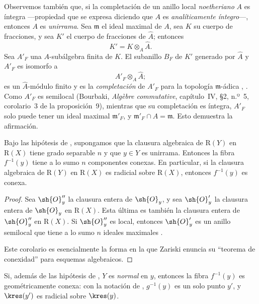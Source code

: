 \documentclass[oneside]{amsart}
\let\EGAOriginalLabel\label
\renewcommand{\label}[1]{\phantomsection\EGAOriginalLabel{#1}}
\begin{document}
Observemos también que, si la completación de un anillo local
\emph{noetheriano} $A$ es íntegra ---propiedad que se expresa diciendo que
$A$ es \emph{analíticamente íntegro}---, entonces $A$ es \emph{unirrama}.
Sea $\mathfrak{m}$ el ideal maximal de $A$, sea $K$ su cuerpo de
fracciones, y sea $K'$ el cuerpo de fracciones de $\widehat{A}$;
entonces
\[
  K'=K\otimes_A\widehat{A}.
\]
Sea $A'_F$ una $A$-subálgebra finita de $K$. El subanillo $B_F$ de
$K'$ generado por $\widehat{A}$ y $A'_F$ es isomorfo a
\[
  A'_F\otimes_A\widehat{A};
\]
es un $\widehat{A}$-módulo finito y es la \emph{completación} de $A'_F$
para la topología $\mathfrak{m}$-ádica
, . Como $A'_F$ es semilocal
(Bourbaki, \emph{Alg\`ebre commutative}, capítulo~IV, \S2, n.º~5,
corolario~3 de la proposición~9), mientras que su completación es
íntegra, $A'_F$ solo puede tener un ideal maximal $\mathfrak{m}'_F$, y
$\mathfrak{m}'_F\cap A=\mathfrak{m}$. Esto demuestra la afirmación.

\begin{corollary}[4.3.7]
\label{III.4.3.7}
Bajo las hipótesis de , supongamos que la clausura
algebraica de $\mathrm{R}(Y)$ en $\mathrm{R}(X)$ tiene grado separable
$n$ y que $y\in Y$ es unirrama. Entonces la fibra $f^{-1}(y)$ tiene a
lo sumo $n$ componentes conexas. En particular, si la clausura
algebraica de $\mathrm{R}(Y)$ en $\mathrm{R}(X)$ es radicial sobre
$\mathrm{R}(X)$, entonces $f^{-1}(y)$ es conexa.
\end{corollary}

\begin{proof}
Sea $\sh{O}''_y$ la clausura entera de $\sh{O}_y$, y sea
$\sh{O}'_y$ la clausura entera de $\sh{O}_y$ en $\mathrm{R}(X)$.
Esta última es también la clausura entera de $\sh{O}''_y$ en
$\mathrm{R}(X)$. Si $\sh{O}''_y$ es local, entonces $\sh{O}'_y$ es
un anillo semilocal que tiene a lo sumo $n$ ideales maximales
\cite[vol.~I, p.~289, Theorem~22]{I-13}.

Este corolario es esencialmente la forma en la que Zariski enuncia su
``teorema de conexidad'' para esquemas algebraicos.
\end{proof}

\begin{remark}[4.3.8]
\label{III.4.3.8}
Si, además de las hipótesis de , $Y$ es \emph{normal} en
$y$, entonces la fibra $f^{-1}(y)$ es geométricamente conexa: con la
notación de , $g^{-1}(y)$ es un solo punto $y'$, y
$\kres(y')$ es radicial sobre $\kres(y)$.
\end{remark}
\end{document}
